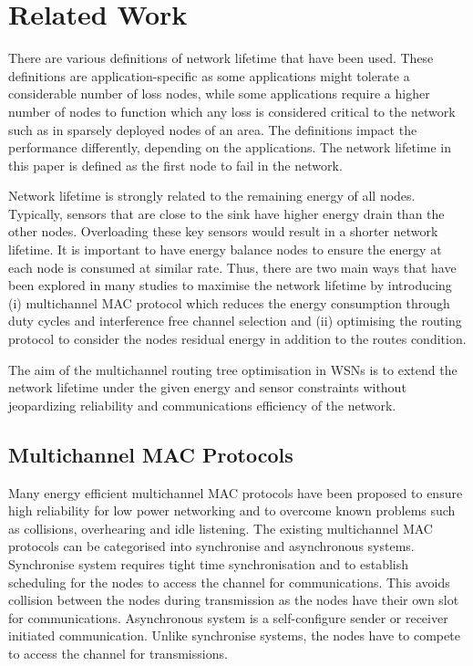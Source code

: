\section{Related Work}
\label{RelatedWork}

There are various definitions of network lifetime that have been used. These definitions are application-specific as some applications might tolerate a considerable number of loss nodes, while some applications require a higher number of nodes to function which any loss is considered critical to the network such as in sparsely deployed nodes of an area. The definitions impact the performance differently, depending on the applications. The network lifetime in this paper is defined as the first node to fail in the network.

Network lifetime is strongly related to the remaining energy of all nodes. Typically, sensors that are close to the sink have higher energy drain than the other nodes. Overloading these key sensors would result in a shorter network lifetime.
It is important to have energy balance nodes to ensure the energy at each node is consumed at similar rate.
Thus, there are two main ways that have been explored in many studies to maximise the network lifetime by introducing (i) multichannel MAC protocol which reduces the energy consumption through duty cycles and interference free channel selection and (ii) optimising the routing protocol to consider the nodes residual energy in addition to the routes condition.

The aim of the multichannel routing tree optimisation in WSNs is to extend the network lifetime under the given energy and sensor constraints without jeopardizing reliability and communications efficiency of the network.

\subsection{Multichannel MAC Protocols}
Many energy efficient multichannel MAC protocols have been proposed to ensure high reliability for low power networking and to overcome known problems such as collisions, overhearing and idle listening.
The existing multichannel MAC protocols can be categorised into synchronise and asynchronous systems. Synchronise system requires tight time synchronisation and to establish scheduling for the nodes to access the channel for communications. This avoids collision between the nodes during transmission as the nodes have their own slot for communications. Asynchronous system is a self-configure sender or receiver initiated communication. Unlike synchronise systems, the nodes have to compete to access the channel for transmissions. 

